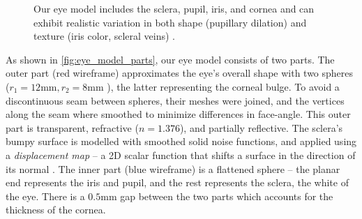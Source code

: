 \begin{figure}
    \captionsetup[subfigure]{labelformat=empty} %
    \captionsetup{subrefformat=parens} %
    \begin{subfigure}[t]{0.33\columnwidth}
        \caption{}\label{fig:eye_model_parts}
    \end{subfigure}
    \hfill
    \begin{subfigure}[t]{0.65\columnwidth}
        \caption{}\label{fig:eye_model_images}
    \end{subfigure}
    \par\vspace{-28pt}
    \caption{Our eye model includes the sclera, pupil, iris, and cornea  and can exhibit realistic variation in both shape (pupillary dilation) and texture (iris color, scleral veins) .}
    \label{fig:eye_model}
\end{figure}


As shown in \autoref{fig:eye_model_parts}, our eye model consists of two parts.
The outer part (red wireframe) approximates the eye's overall shape with two spheres ($r_1\!=\!12\textrm{mm}, r_2\!=\!8\textrm{mm}$ \cite{ruhland2014look}), the latter representing the corneal bulge.
To avoid a discontinuous seam between spheres, their meshes were joined, and the vertices along the seam where smoothed to minimize differences in face-angle.
This outer part is transparent, refractive ($n\!=\!1.376$), and partially reflective.
The sclera's bumpy surface is modelled with smoothed solid noise functions, and applied using a \emph{displacement map} -- a 2D scalar function that shifts a surface in the direction of its normal \cite{lee2000displaced}.
The inner part (blue wireframe) is a flattened sphere  -- the planar end represents the iris and pupil, and the rest represents the sclera, the white of the eye.
There is a $0.5\textrm{mm}$ gap between the two parts which accounts for the thickness of the cornea.

